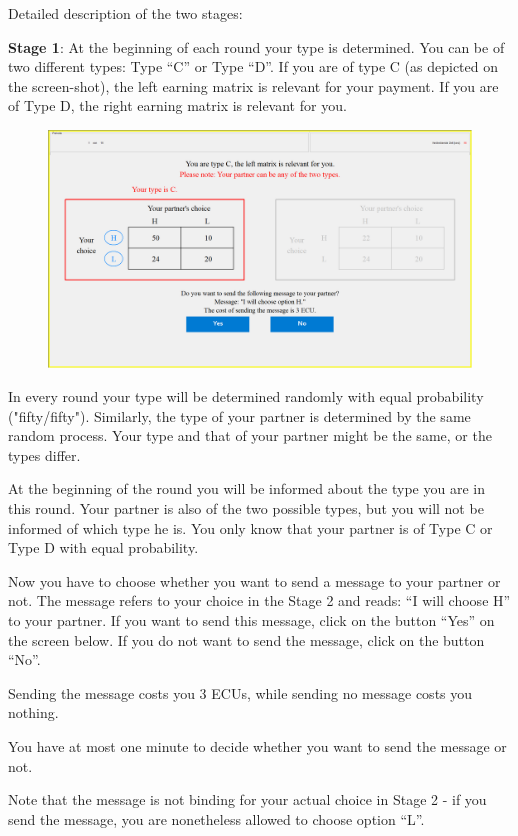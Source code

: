 \documentclass[12pt]{article}
\theoremstyle{break}
\begin{document}
Detailed description of the two stages: 

\textbf{Stage 1}: At the beginning of each round your type is determined. You can be of two different types: Type “C” or Type “D”. If you are of type C (as depicted on the screen-shot), the left earning matrix is relevant for your payment. If you are of Type D, the right earning matrix is relevant for you. 
 
\begin{figure}[h]
  \centering
    \includegraphics[width=.9\textwidth]{fig1-FC-instructions.png}
 \label{fig:fig1-FC-instructions}
\end{figure}

In every round your type will be determined randomly with equal probability ("fifty/fifty"). Similarly, the type of your partner is determined by the same random process. Your type and that of your partner might be the same, or the types differ.

At the beginning of the round you will be informed about the type you are in this round. Your partner is also of the two possible types, but you will not be informed of which type he is. You only know that your partner is of Type C or Type D with equal probability.

Now you have to choose whether you want to send a message to your partner or not. The message refers to your choice in the Stage 2 and reads: “I will choose H” to your partner. If you want to send this message, click on the button ``Yes'' on the screen below. If you do not want to send the message, click on the button ``No''. 

Sending the message costs you 3 ECUs, while sending no message costs you nothing.

You have at most one minute to decide whether you want to send the message or not. 

Note that the message is not binding for your actual choice in Stage 2 - if you send the message, you are nonetheless allowed to choose option ``L''.
\end{document}
